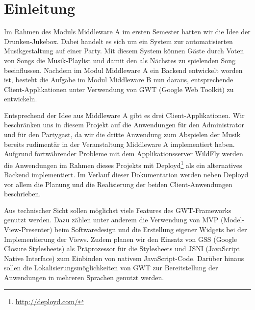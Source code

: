 \section{Einleitung}
Im Rahmen des Moduls Middleware A im ersten Semester hatten wir die Idee der Drunken-Jukebox. Dabei handelt es sich um ein System zur automatisierten Musikgestaltung auf einer Party. Mit diesem System können Gäste durch Voten von Songs die Musik-Playlist und damit den als Nächstes zu spielenden Song beeinflussen. Nachdem im Modul Middleware A ein Backend entwickelt worden ist, besteht die Aufgabe im Modul Middleware B nun daraus, entsprechende Client-Applikationen unter Verwendung von GWT (Google Web Toolkit) zu entwickeln.

Entsprechend der Idee aus Middleware A gibt es drei Client-Applikationen. Wir beschränken uns in diesem Projekt auf die Anwendungen für den Administrator und für den Partygast, da wir die dritte Anwendung zum Abspielen der Musik bereits rudimentär in der Veranstaltung Middleware A implementiert haben. Aufgrund fortwährender Probleme mit dem Applikationsserver WildFly werden die Anwendungen im Rahmen dieses Projekts mit Deployd\footnote{\url{http://deployd.com/}} als ein alternatives Backend implementiert. Im Verlauf dieser Dokumentation werden neben Deployd vor allem die Planung und die Realisierung der beiden Client-Anwendungen beschrieben.

Aus technischer Sicht sollen möglichst viele Features des GWT-Frameworks genutzt werden. Dazu zählen unter anderem die Verwendung von MVP (Model-View-Presenter) beim Softwaredesign und die Erstellung eigener Widgets bei der Implementierung der Views. Zudem planen wir den Einsatz von GSS (Google Closure Stylesheets) als Präprozessor für die Stylesheets und JSNI (JavaScript Native Interface) zum Einbinden von nativem JavaScript-Code. Darüber hinaus sollen die Lokalisierungsmöglichkeiten von GWT zur Bereitstellung der Anwendungen in mehreren Sprachen genutzt werden.